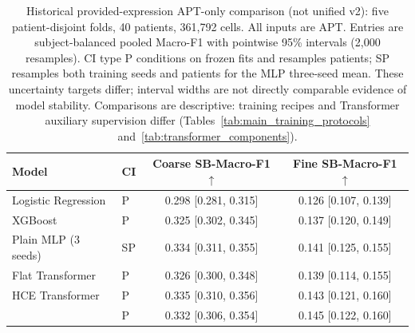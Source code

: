 \begin{table}[H]
\centering\small
\setlength{\tabcolsep}{6pt}
\begin{tabular}{llcc}
\toprule
Model & CI & Coarse SB-Macro-F1 $\uparrow$ & Fine SB-Macro-F1 $\uparrow$ \\
\midrule
Logistic Regression & P & 0.298 [0.281, 0.315] & 0.126 [0.107, 0.139] \\
XGBoost & P & 0.325 [0.302, 0.345] & 0.137 [0.120, 0.149] \\
Plain MLP (3 seeds) & SP & 0.334 [0.311, 0.355] & 0.141 [0.125, 0.155] \\
Flat Transformer & P & 0.326 [0.300, 0.348] & 0.139 [0.114, 0.155] \\
HCE Transformer & P & 0.335 [0.310, 0.356] & 0.143 [0.121, 0.160] \\
\ourmethod{} & P & 0.332 [0.306, 0.354] & 0.145 [0.122, 0.160] \\
\bottomrule
\end{tabular}
\caption{Historical provided-expression APT-only comparison (not unified v2): five patient-disjoint folds, 40 patients, 361{,}792 cells. All inputs are APT. Entries are subject-balanced pooled Macro-F1 with pointwise 95\% intervals (2{,}000 resamples). CI type P conditions on frozen fits and resamples patients; SP resamples both training seeds and patients for the MLP three-seed mean. These uncertainty targets differ; interval widths are not directly comparable evidence of model stability. Comparisons are descriptive: training recipes and Transformer auxiliary supervision differ (Tables~\ref{tab:main_training_protocols} and~\ref{tab:transformer_components}).}
\label{tab:historical_main}
\end{table}
